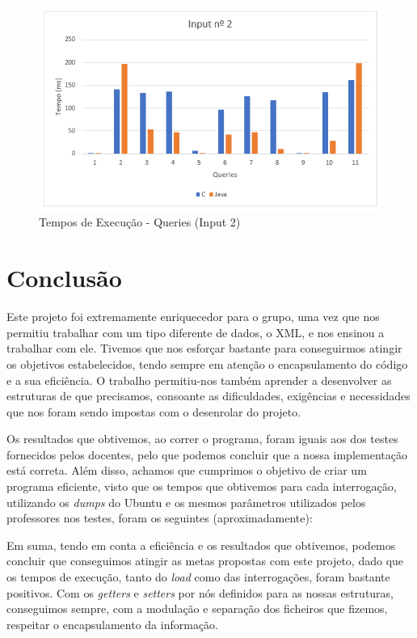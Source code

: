 \documentclass[a4paper, 11pt, oneside]{article}
\begin{document}
\begin{figure}[h] 
\centering
\includegraphics[scale=.5]{input_2.png}
\caption{Tempos de Execução - Queries (Input 2) \label{graphQs2}}
\end{figure}

\newpage
\section{Conclusão}




Este projeto foi extremamente enriquecedor para o grupo, uma vez que nos permitiu trabalhar com um tipo diferente de dados, o XML, e nos ensinou a trabalhar com ele. 
Tivemos que nos esforçar bastante para conseguirmos atingir os objetivos estabelecidos, tendo sempre em atenção o encapsulamento do código e a sua eficiência. O trabalho 
permitiu-nos também aprender a desenvolver as estruturas de que precisamos, consoante as dificuldades, exigências e necessidades que nos foram sendo impostas com o 
desenrolar do projeto.

Os resultados que obtivemos, ao correr o programa, foram iguais aos dos testes fornecidos pelos docentes,
pelo que podemos concluir que a nossa implementação está correta.
Além disso, achamos que cumprimos o objetivo de criar um programa eficiente,
visto que os tempos que obtivemos para cada interrogação, utilizando os \textit{dumps} do
Ubuntu e os mesmos parâmetros utilizados pelos professores nos testes, foram os seguintes (aproximadamente):


Em suma, tendo em conta a eficiência e os resultados que obtivemos, podemos concluir
que conseguimos atingir as metas propostas com este projeto, dado que os tempos de
execução, tanto do \textit{load} como das interrogações, foram bastante positivos.
Com os \textit{getters} e \textit{setters} por nós definidos para as nossas estruturas,
conseguimos sempre, com a modulação e separação dos ficheiros que fizemos, respeitar o encapsulamento da informação.
\end{document}
